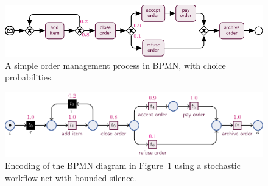 \begin{figure}[!t]
	\centering
	\includegraphics[width=\textwidth]{images/bpmn-order}
	\caption{A simple order management process in BPMN, with choice probabilities.}\label{fig:bpmn-order}
\end{figure}
\begin{figure}[!t]
		\centering
	\includegraphics[width=\textwidth]{images/petri_order}
	\caption{Encoding of the BPMN diagram in Figure~\ref{fig:bpmn-order} using a stochastic workflow net with bounded silence.}\label{fig:petri_tut}
\end{figure}

%	
